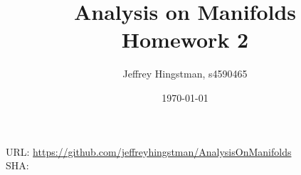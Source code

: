\documentclass[a4paper, 12pt]{article}
\newcommand{\reponame}{https://github.com/jeffreyhingstman/AnalysisOnManifolds}    %
\begin{document}
	\title{Analysis on Manifolds \\[0.5cm] \large{Homework 2}} 
	\date{\today}
	\author{Jeffrey Hingstman, s4590465}	\maketitle
	\vspace*{\fill}
	\noindent
	URL: \url{\reponame} \\
	SHA: \commithash
	\clearpage
	

	
\end{document}
